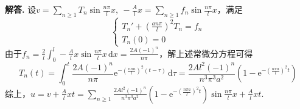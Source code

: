 \documentclass[12pt, a4paper, oneside]{ctexart}
\newenvironment{solution}[1][]{\par\noindent\textbf{#1解答. }}{\smallskip\par}  %
\let\geq=\geqslant %
\def\d{\mathrm{d}}          %
\def\e{\mathrm{e}}          %
\begin{document}
\begin{solution}
    设$v = \sum_{n\geq 1}T_n\sin\frac{n\pi}{l}x,\ -\frac{A}{l}x=  \sum_{n\geq 1}f_n\sin\frac{n\pi}{l}x$，满足
    \begin{equation*}
        \begin{cases}
            T_n'+\left(\frac{an\pi}{l}\right)^2T_n = f_n\\
            T_n(0) = 0
        \end{cases}
    \end{equation*}
    由于$f_n = \frac{2}{l}\int_0^l-\frac{A}{l}x\sin\frac{n\pi}{l}x\,\d x = \frac{2A(-1)^n}{n\pi}$，解上述常微分方程可得
    \begin{equation*}
        T_n(t) = \int_0^t\frac{2A(-1)^n}{n\pi}\e^{-\left(\frac{n\pi a}{l}\right)^2(t-\tau)}\,\d \tau = \frac{2Al^2(-1)^n}{n^3\pi^3a^2}\left(1-\e^{-\left(\frac{n\pi a}{l}\right)^2t}\right)
    \end{equation*}
    综上，$u = v  + \frac{A}{l}xt = \sum_{n\geq 1}\frac{2Al^2(-1)^n}{n^3\pi^3a^2}\left(1-\e^{-\left(\frac{n\pi a}{l}\right)^2t}\right)\sin\frac{n\pi}{l}x + \frac{A}{l}xt$.


\end{solution}
\end{document}
